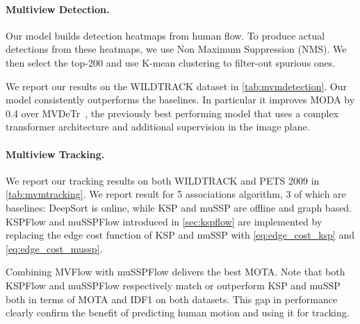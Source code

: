 \documentclass[10pt,twocolumn,letterpaper]{article}
\begin{document}
\paragraph{Multiview Detection.}

Our model builds detection heatmaps from human flow. To produce actual detections from these heatmaps, we use Non Maximum Suppression (NMS). We then select the top-200 and use K-mean clustering to filter-out spurious ones.

We report our results on the WILDTRACK dataset in \cref{tab:mvmdetection}. Our model consistently outperforms the baselines.  In particular it improves MODA by 0.4 over MVDeTr~\cite{hou2021multiview}, the previously best performing model that uses a complex transformer architecture and additional supervision in the image plane.

\paragraph{Multiview Tracking.} 

We report our tracking results on both WILDTRACK and PETS 2009 in \cref{tab:mvmtracking}. We report result for 5 associations algorithm, 3 of which are baselines: DeepSort is online, while KSP and muSSP are offline and graph based. KSPFlow and muSSPFlow introduced in \cref{sec:kspflow} are implemented by replacing the edge cost function of KSP and muSSP with \cref{eq:edge_cost_ksp} and \cref{eq:edge_cost_mussp}. 

Combining MVFlow with muSSPFlow delivers the best MOTA. Note that both KSPFlow and muSSPFlow respectively match or outperform KSP and muSSP both in terms of MOTA and IDF1 on both datasets.
This gap in performance clearly confirm the benefit of predicting human motion and using it for tracking.
\end{document}

